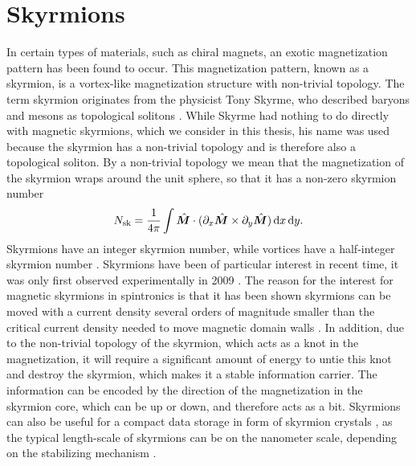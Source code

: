 \section{Skyrmions} \label{sec:Skyrmions}
In certain types of materials, such as chiral magnets, an exotic magnetization pattern has been found to occur. This magnetization pattern, known as a skyrmion, is a vortex-like magnetization structure with non-trivial topology. The term skyrmion originates from the physicist Tony Skyrme, who described baryons and mesons as topological solitons \cite{Skyrme1962}. While Skyrme had nothing to do directly with magnetic skyrmions, which we consider in this thesis, his name was used because the skyrmion has a non-trivial topology and is therefore also a topological soliton. By a non-trivial topology we mean that the magnetization of the skyrmion wraps around the unit sphere, so that it has a non-zero skyrmion number \cite{Heinze2011}
\begin{align}
\label{eq:SkyrmionNumber}
N_{\textrm{sk}} = \frac{1}{4\pi}\int \mathbold{\hat{M}}\cdot(\partial_x \mathbold{\hat{M}} \times \partial_y \mathbold{\hat{M}}) \d x \d y.
\end{align}
Skyrmions have an integer skyrmion number, while vortices have a half-integer skyrmion number \cite{Tretiakov2007}. Skyrmions have been of particular interest in recent time, it was only first observed experimentally in 2009 \cite{Muhlbauer2009}. The reason for the interest for magnetic skyrmions in spintronics is that it has been shown skyrmions can be moved with a current density several orders of magnitude smaller than the critical current density needed to move magnetic domain walls \cite{Jonietz2010}. In addition, due to the non-trivial topology of the skyrmion, which acts as a knot in the magnetization, it will require a significant amount of energy to untie this knot and destroy the skyrmion, which makes it a stable information carrier. The information can be encoded by the direction of the magnetization in the skyrmion core, which can be up or down, and therefore acts as a bit. Skyrmions can also be useful for a compact data storage in form of skyrmion crystals \cite{Fert2013}, as the typical length-scale of skyrmions can be on the nanometer scale, depending on the stabilizing mechanism \cite{Nagaosa2013}. 

